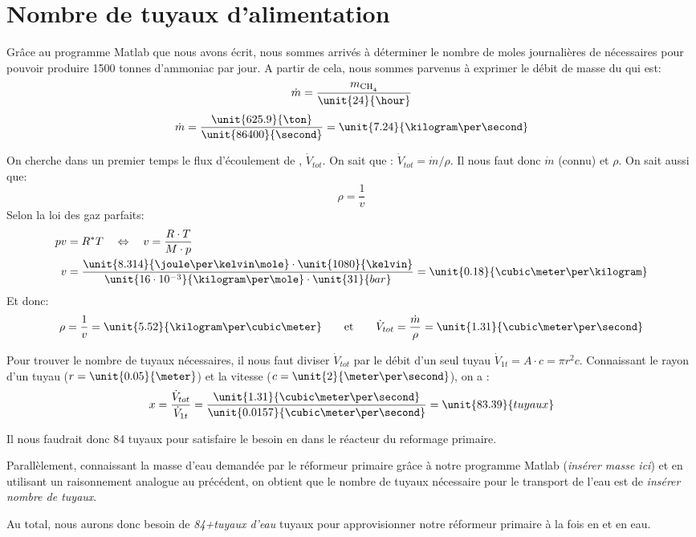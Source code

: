 \section{Nombre de tuyaux d'alimentation}

Grâce au programme Matlab que nous avons écrit, nous sommes arrivés à déterminer le nombre de moles journalières de  nécessaires pour pouvoir produire 1500 tonnes d'ammoniac par jour. A partir de cela, nous sommes parvenus à exprimer le débit de masse du  qui est:
    $$\dot{m}=\frac{m_{\ce{CH4}}}{\unit{24}{\hour}}$$
    $$\dot{m}=\frac{\unit{625.9}{\ton}}{\unit{86400}{\second}}=\unit{7.24}{\kilogram\per\second}$$

On cherche dans un premier temps le flux d'écoulement de , $\dot{V}_{tot}$. On sait que :
$\dot{V}_{tot}={\dot{m}}/{\rho}$.
Il nous faut donc $\dot{m}$ (connu) et $\rho$. On sait aussi que:
\[ \rho = \frac{1}{v} \]
Selon la loi des gaz parfaits:
\begin{align*}
    pv &= R^{*}T \quad\Leftrightarrow\quad v = \frac{R\cdot T}{M\cdot p} \\
    v &= \frac{\unit{8.314}{\joule\per\kelvin\mole}\cdot\unit{1080}{\kelvin}}{\unit{16\cdot10^{-3}}{\kilogram\per\mole}\cdot\unit{31}{bar}}=\unit{0.18}{\cubic\meter\per\kilogram}
\end{align*}
Et donc:
\[
    \rho = \frac{1}{v} = \unit{5.52}{\kilogram\per\cubic\meter}
    \qquad\text{et}\qquad
    \dot{V}_{tot} = \frac{\dot{m}}{\rho}=\unit{1.31}{\cubic\meter\per\second}
\]

Pour trouver le nombre de tuyaux nécessaires, il nous faut diviser $\dot{V}_{tot}$ par le débit d'un seul tuyau $\dot{V}_{1t} = A\cdot c = \pi r^2 c$. Connaissant le rayon d'un tuyau ($r=\unit{0.05}{\meter}$) et la vitesse ($c=\unit{2}{\meter\per\second}$), on a :
\[
    x = \frac{\dot{V}_{tot}}{\dot{V}_{1t}}
      = \frac{\unit{1.31}{\cubic\meter\per\second}}{\unit{0.0157}{\cubic\meter\per\second}}
      = \unit{83.39}{tuyaux}
\]

Il nous faudrait donc 84 tuyaux pour satisfaire le besoin en  dans le réacteur du reformage primaire.

Parallèlement, connaissant la masse d'eau demandée par le réformeur primaire grâce à notre programme Matlab (\emph{insérer masse ici}) et en utilisant un raisonnement analogue au précédent, on obtient que le nombre de tuyaux nécessaire pour le transport de l'eau est de \emph{insérer nombre de tuyaux}.

Au total, nous aurons donc besoin de \emph{84+tuyaux d'eau} tuyaux pour approvisionner notre réformeur primaire à la fois en  et en eau.